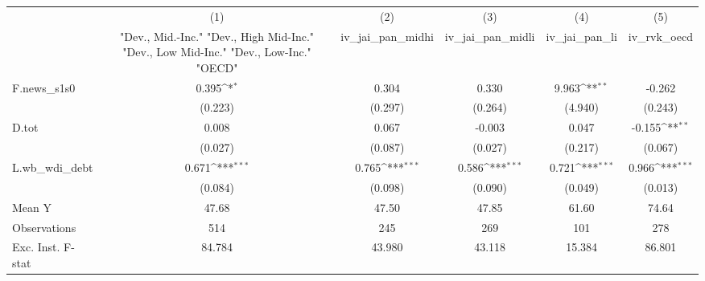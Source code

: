 {
\def\sym#1{\ifmmode^{#1}\else\(^{#1}\)\fi}
\begin{tabular}{l*{5}{c}}
\toprule
            &\multicolumn{1}{c}{(1)}&\multicolumn{1}{c}{(2)}&\multicolumn{1}{c}{(3)}&\multicolumn{1}{c}{(4)}&\multicolumn{1}{c}{(5)}\\
            &\multicolumn{1}{c}{ "Dev., Mid.-Inc." "Dev., High Mid-Inc." "Dev., Low Mid-Inc." "Dev., Low-Inc." "OECD" }&\multicolumn{1}{c}{iv\_jai\_pan\_midhi}&\multicolumn{1}{c}{iv\_jai\_pan\_midli}&\multicolumn{1}{c}{iv\_jai\_pan\_li}&\multicolumn{1}{c}{iv\_rvk\_oecd}\\
\midrule
F.news\_s1s0 &       0.395\sym{*}  &       0.304         &       0.330         &       9.963\sym{**} &      -0.262         \\
            &     (0.223)         &     (0.297)         &     (0.264)         &     (4.940)         &     (0.243)         \\
\addlinespace
D.tot       &       0.008         &       0.067         &      -0.003         &       0.047         &      -0.155\sym{**} \\
            &     (0.027)         &     (0.087)         &     (0.027)         &     (0.217)         &     (0.067)         \\
\addlinespace
L.wb\_wdi\_debt&       0.671\sym{***}&       0.765\sym{***}&       0.586\sym{***}&       0.721\sym{***}&       0.966\sym{***}\\
            &     (0.084)         &     (0.098)         &     (0.090)         &     (0.049)         &     (0.013)         \\
\midrule
Mean Y      &       47.68         &       47.50         &       47.85         &       61.60         &       74.64         \\
Observations&         514         &         245         &         269         &         101         &         278         \\
Exc. Inst. F-stat&      84.784         &      43.980         &      43.118         &      15.384         &      86.801         \\
\bottomrule
\end{tabular}
}
